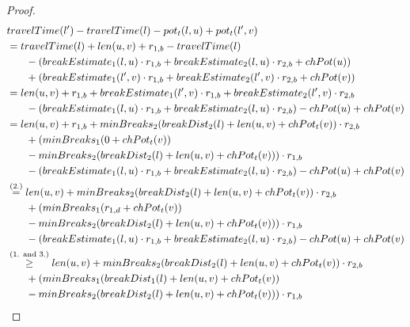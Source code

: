 \begin{proof}
	\begin{align}
		\begin{split}\label{eq:label_n_feasibility_proof_2}
			&\concretett(l') - \concretett(l) - \concretepotential_t(l,u) + \concretepotential_t(l',v)\\
			&= \concretett(l) + \len(u,v) + r_{1,b} - \concretett(l)\\
			& \phantom{{}=1} - (\breakEstimate_1(l,u) \cdot \restr_{1,b} + \breakEstimate_2(l,u) \cdot \restr_{2,b} + \chpotential(u))\\
			& \phantom{{}=1} + (\breakEstimate_1(l',v) \cdot \restr_{1,b} + \breakEstimate_2(l',v) \cdot \restr_{2,b} + \chpotential(v))\\
			&= \len(u,v) + r_{1,b} + \breakEstimate_1(l',v) \cdot \restr_{1,b} + \breakEstimate_2(l',v) \cdot \restr_{2,b} \\
			& \phantom{{}=1} - (\breakEstimate_1(l,u) \cdot \restr_{1,b} + \breakEstimate_2(l,u) \cdot \restr_{2,b}) - \chpotential(u) + \chpotential(v)\\
			&= \len(u,v) + r_{1,b} + \minBreaks_2(\breakDist_2(l) + \len(u,v) + \chpotential_t(v)) \cdot \restr_{2,b}\\
			& \phantom{{}=1} + (\minBreaks_1(0 + \chpotential_t(v))\\
			& \phantom{{}=1} - \minBreaks_{2}(\breakDist_{2}(l) + \len(u,v) + \chpotential_t(v))) \cdot \restr_{1,b} \\
			& \phantom{{}=1} - (\breakEstimate_1(l,u) \cdot \restr_{1,b} + \breakEstimate_2(l,u) \cdot \restr_{2,b}) - \chpotential(u) + \chpotential(v)\\
			&\stackrel{\text{(2.)}}{=} \len(u,v) + \minBreaks_2(\breakDist_2(l) + \len(u,v) + \chpotential_t(v)) \cdot \restr_{2,b}\\
			& \phantom{{}=1} + (\minBreaks_1(r_{1,d} + \chpotential_t(v))\\
			& \phantom{{}=1} - \minBreaks_{2}(\breakDist_{2}(l) + \len(u,v) + \chpotential_t(v))) \cdot \restr_{1,b} \\
			& \phantom{{}=1} - (\breakEstimate_1(l,u) \cdot \restr_{1,b} + \breakEstimate_2(l,u) \cdot \restr_{2,b}) - \chpotential(u) + \chpotential(v)\\
			&\stackrel{\text{(1. and 3.)}}{\ge} \len(u,v) + \minBreaks_2(\breakDist_2(l) + \len(u,v) + \chpotential_t(v)) \cdot \restr_{2,b}\\
			& \phantom{{}=1} + (\minBreaks_1(\breakDist_1(l) + \len(u,v) + \chpotential_t(v))\\
			& \phantom{{}=1} - \minBreaks_{2}(\breakDist_{2}(l) + \len(u,v) + \chpotential_t(v))) \cdot \restr_{1,b} \\

\end{split}
\end{align}
\end{proof}
